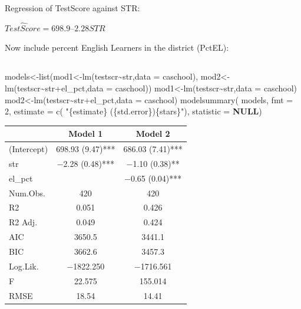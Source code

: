 \documentclass[
  letterpaper,
  DIV=11,
  numbers=noendperiod]{scrartcl}
\newenvironment{Shaded}{\begin{snugshade}}{\end{snugshade}}
\newcommand{\AttributeTok}[1]{\textcolor[rgb]{0.56,0.74,0.73}{#1}}
\newcommand{\ConstantTok}[1]{\textcolor[rgb]{0.93,0.94,0.96}{\textbf{#1}}}
\newcommand{\DecValTok}[1]{\textcolor[rgb]{0.71,0.56,0.68}{#1}}
\newcommand{\FunctionTok}[1]{\textcolor[rgb]{0.53,0.75,0.82}{#1}}
\newcommand{\NormalTok}[1]{\textcolor[rgb]{0.85,0.87,0.91}{#1}}
\newcommand{\OtherTok}[1]{\textcolor[rgb]{0.56,0.74,0.73}{#1}}
\newcommand{\SpecialCharTok}[1]{\textcolor[rgb]{0.92,0.80,0.55}{#1}}
\newcommand{\StringTok}[1]{\textcolor[rgb]{0.64,0.75,0.55}{#1}}
\begin{document}
Regression of TestScore against STR:

\(\widehat{TestScore}= 698.9 – 2.28STR\)

Now include percent English Learners in the district (PctEL):

\hypertarget{section-9}{%
\subsection{}\label{section-9}}

\begin{Shaded}
\begin{Highlighting}[]
\NormalTok{models}\OtherTok{\textless{}{-}}\FunctionTok{list}\NormalTok{(mod1}\OtherTok{\textless{}{-}}\FunctionTok{lm}\NormalTok{(testscr}\SpecialCharTok{\textasciitilde{}}\NormalTok{str,}\AttributeTok{data =}\NormalTok{ caschool),}
\NormalTok{mod2}\OtherTok{\textless{}{-}}\FunctionTok{lm}\NormalTok{(testscr}\SpecialCharTok{\textasciitilde{}}\NormalTok{str}\SpecialCharTok{+}\NormalTok{el\_pct,}\AttributeTok{data =}\NormalTok{ caschool))}
\NormalTok{mod1}\OtherTok{\textless{}{-}}\FunctionTok{lm}\NormalTok{(testscr}\SpecialCharTok{\textasciitilde{}}\NormalTok{str,}\AttributeTok{data =}\NormalTok{ caschool)}
\NormalTok{mod2}\OtherTok{\textless{}{-}}\FunctionTok{lm}\NormalTok{(testscr}\SpecialCharTok{\textasciitilde{}}\NormalTok{str}\SpecialCharTok{+}\NormalTok{el\_pct,}\AttributeTok{data =}\NormalTok{ caschool)}
\FunctionTok{modelsummary}\NormalTok{(}
\NormalTok{  models,}
  \AttributeTok{fmt =} \DecValTok{2}\NormalTok{,}
  \AttributeTok{estimate  =} \FunctionTok{c}\NormalTok{(}
                \StringTok{"\{estimate\} (\{std.error\})\{stars\}"}\NormalTok{),}
  \AttributeTok{statistic =} \ConstantTok{NULL}\NormalTok{)}
\end{Highlighting}
\end{Shaded}

\begin{table}
\centering
\begin{tabular}[t]{lcc}
\toprule
  & Model 1 & Model 2\\
\midrule
(Intercept) & \num{698.93} (\num{9.47})*** & \num{686.03} (\num{7.41})***\\
str & \num{-2.28} (\num{0.48})*** & \num{-1.10} (\num{0.38})**\\
el\_pct &  & \num{-0.65} (\num{0.04})***\\
\midrule
Num.Obs. & \num{420} & \num{420}\\
R2 & \num{0.051} & \num{0.426}\\
R2 Adj. & \num{0.049} & \num{0.424}\\
AIC & \num{3650.5} & \num{3441.1}\\
BIC & \num{3662.6} & \num{3457.3}\\
Log.Lik. & \num{-1822.250} & \num{-1716.561}\\
F & \num{22.575} & \num{155.014}\\
RMSE & \num{18.54} & \num{14.41}\\
\bottomrule
\end{tabular}
\end{table}
\end{document}
